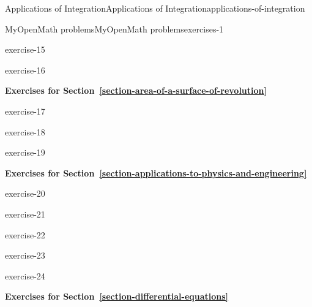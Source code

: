 \documentclass[oneside,10pt,]{book}
\numberwithin{equation}{section}
\begin{document}
\begin{chapterptx}{Applications of Integration}{}{Applications of Integration}{}{}{applications-of-integration}
\begin{exercises-section}{MyOpenMath problems}{}{MyOpenMath problems}{}{}{exercises-1}
\begin{exercisegroup}
\begin{divisionexerciseeg}{15}{}{}{exercise-15}%
\end{divisionexerciseeg}%
\begin{divisionexerciseeg}{16}{}{}{exercise-16}%
\end{divisionexerciseeg}%
\end{exercisegroup}
\par\medskip\noindent
\par\medskip\noindent%
\textbf{Exercises for Section~\ref*{section-area-of-a-surface-of-revolution}}\space\space\hypertarget{exercisegroup-5}{}%
\begin{exercisegroup}
\begin{divisionexerciseeg}{17}{}{}{exercise-17}%
\end{divisionexerciseeg}%
\begin{divisionexerciseeg}{18}{}{}{exercise-18}%
\end{divisionexerciseeg}%
\begin{divisionexerciseeg}{19}{}{}{exercise-19}%
\end{divisionexerciseeg}%
\end{exercisegroup}
\par\medskip\noindent
\par\medskip\noindent%
\textbf{Exercises for Section~\ref*{section-applications-to-physics-and-engineering}}\space\space\hypertarget{exercisegroup-6}{}%
\begin{exercisegroup}
\begin{divisionexerciseeg}{20}{}{}{exercise-20}%
\end{divisionexerciseeg}%
\begin{divisionexerciseeg}{21}{}{}{exercise-21}%
\end{divisionexerciseeg}%
\begin{divisionexerciseeg}{22}{}{}{exercise-22}%
\end{divisionexerciseeg}%
\begin{divisionexerciseeg}{23}{}{}{exercise-23}%
\end{divisionexerciseeg}%
\begin{divisionexerciseeg}{24}{}{}{exercise-24}%
\end{divisionexerciseeg}%
\end{exercisegroup}
\par\medskip\noindent
\par\medskip\noindent%
\textbf{Exercises for Section~\ref*{section-differential-equations}}\space\space\hypertarget{exercisegroup-7}{}%
\begin{exercisegroup}

\end{exercisegroup}
\end{exercises-section}
\end{chapterptx}
\end{document}
